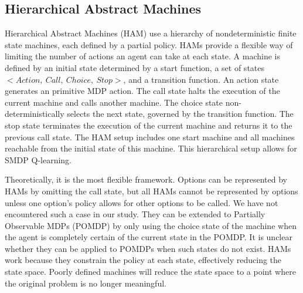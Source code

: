 \subsection{Hierarchical Abstract Machines}

Hierarchical Abstract Machines (HAM) \cite{Parr} use a hierarchy of nondeterministic finite state machines, each defined by a partial policy.
HAMs provide a flexible way of limiting the number of actions an agent can take at each state.
A machine is defined by an initial state determined by a start function, a set of states $<Action,\ Call,\ Choice,\ Stop>$, and a transition function.
An action state generates
an primitive MDP action. The call state halts the
execution of the current machine and calls another
machine. The choice state non-deterministically selects the next state, governed by the transition function. The
stop state terminates the execution of the current machine and returns it to the previous call state. The HAM setup includes one start machine and all machines reachable from the initial state of this machine. This hierarchical setup allows for SMDP Q-learning. 

Theoretically, it is the most flexible framework. Options can be represented
by HAMs by omitting the call state, but all HAMs cannot be represented by
options unless one option's policy allows for other options to be called. We
have not encountered such a case in our study. They can be extended to Partially Observable MDPs (POMDP)
by only using the choice state of the machine when the agent is completely
certain of the current state in the POMDP. It is unclear whether they can be
applied to POMDPs when such states do not exist. HAMs work because they
constrain the policy at each state, effectively reducing the state space.
Poorly defined machines will reduce the state space to a point where the
original problem is no longer meaningful.
